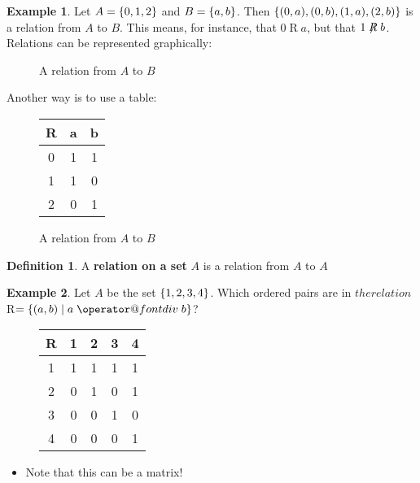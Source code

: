 \documentclass[article, 12pt]{article}
\makeatletter
\theoremstyle{definition}
\newtheorem{example}{Example}[subsection]
\newtheorem{definition}{Definition}[subsection]
\DeclarePairedDelimiter\set{\{}{\}}
\newcommand*{\bdiv}{%
  \nonscript\mskip-\medmuskip\mkern5mu%
  \mathbin{\operator@font div}\penalty900\mkern5mu%
  \nonscript\mskip-\medmuskip
}
\makeatother
\begin{document}
    \begin{example}
        Let $A = \set*{0,1,2}$ and $B=\set*{a,b}$. Then $\set*{(0,a),(0,b),(1,a),(2,b)}$ is a relation from $A$ to $B$. This means, for instance, that $0 \mathrel{R} a$, but that $1 \not \mathrel{R} b$. Relations can be represented graphically:
        \begin{figure}[H]
            \centering
            \caption{A relation from $A$ to $B$}
            \label{fig:relation}
        \end{figure}
        Another way is to use a table:
        \begin{figure}[H]
            \centering
            \begin{tabular}{c|c c}
                R & a & b \\
                \hline
                0 & 1 & 1 \\
                1 & 1 & 0 \\
                2 & 0 & 1 \\
            \end{tabular}
            \caption{A relation from $A$ to $B$}
            \label{fig:relation table}
        \end{figure}
    \end{example}
    \begin{definition}
        A \textbf{relation on a set} $A$ is a relation from $A$ to $A$
    \end{definition}
    \begin{example}
        Let $A$ be the set $\set*{1,2,3,4}$. Which ordered pairs are in $the relation $R$ = \set*{(a,b) \mid a \bdiv b}$?
        \begin{figure}[H]
            \centering
            \begin{tabular}{c|c c c c}
                R & 1 & 2 & 3 & 4 \\
                \hline
                1 & 1 & 1 & 1 & 1 \\
                2 & 0 & 1 & 0 & 1 \\
                3 & 0 & 0 & 1 & 0 \\
                4 & 0 & 0 & 0 & 1 \\
            \end{tabular}
            \label{fig:example 1.1.2}
        \end{figure}
        \begin{itemize}
            \item Note that this can be a matrix!
        \end{itemize}
    \end{example}
\end{document}
